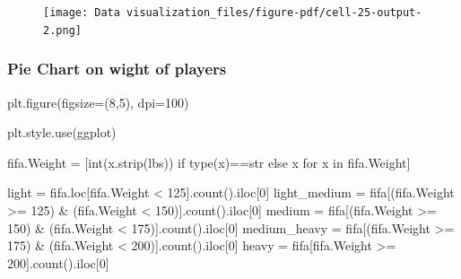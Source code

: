 \documentclass[
  letterpaper,
  DIV=11,
  numbers=noendperiod]{scrreprt}
\newenvironment{Shaded}{\begin{snugshade}}{\end{snugshade}}
\newcommand{\BuiltInTok}[1]{\textcolor[rgb]{0.00,0.23,0.31}{#1}}
\newcommand{\ControlFlowTok}[1]{\textcolor[rgb]{0.00,0.23,0.31}{#1}}
\newcommand{\DecValTok}[1]{\textcolor[rgb]{0.68,0.00,0.00}{#1}}
\newcommand{\KeywordTok}[1]{\textcolor[rgb]{0.00,0.23,0.31}{#1}}
\newcommand{\NormalTok}[1]{\textcolor[rgb]{0.00,0.23,0.31}{#1}}
\newcommand{\OperatorTok}[1]{\textcolor[rgb]{0.37,0.37,0.37}{#1}}
\newcommand{\StringTok}[1]{\textcolor[rgb]{0.13,0.47,0.30}{#1}}
\begin{document}
\begin{figure}[H]

{\centering \texttt{[image: Data visualization\_files/figure-pdf/cell-25-output-2.png]}

}

\end{figure}

\hypertarget{pie-chart-on-wight-of-players}{%
\subsubsection{Pie Chart on wight of
players}\label{pie-chart-on-wight-of-players}}

\begin{Shaded}
\begin{Highlighting}[]
\NormalTok{plt.figure(figsize}\OperatorTok{=}\NormalTok{(}\DecValTok{8}\NormalTok{,}\DecValTok{5}\NormalTok{), dpi}\OperatorTok{=}\DecValTok{100}\NormalTok{)}

\NormalTok{plt.style.use(}\StringTok{\textquotesingle{}ggplot\textquotesingle{}}\NormalTok{)}

\NormalTok{fifa.Weight }\OperatorTok{=}\NormalTok{ [}\BuiltInTok{int}\NormalTok{(x.strip(}\StringTok{\textquotesingle{}lbs\textquotesingle{}}\NormalTok{)) }\ControlFlowTok{if} \BuiltInTok{type}\NormalTok{(x)}\OperatorTok{==}\BuiltInTok{str} \ControlFlowTok{else}\NormalTok{ x }\ControlFlowTok{for}\NormalTok{ x }\KeywordTok{in}\NormalTok{ fifa.Weight]}

\NormalTok{light }\OperatorTok{=}\NormalTok{ fifa.loc[fifa.Weight }\OperatorTok{\textless{}} \DecValTok{125}\NormalTok{].count().iloc[}\DecValTok{0}\NormalTok{]}
\NormalTok{light\_medium }\OperatorTok{=}\NormalTok{ fifa[(fifa.Weight }\OperatorTok{\textgreater{}=} \DecValTok{125}\NormalTok{) }\OperatorTok{\&}\NormalTok{ (fifa.Weight }\OperatorTok{\textless{}} \DecValTok{150}\NormalTok{)].count().iloc[}\DecValTok{0}\NormalTok{]}
\NormalTok{medium }\OperatorTok{=}\NormalTok{ fifa[(fifa.Weight }\OperatorTok{\textgreater{}=} \DecValTok{150}\NormalTok{) }\OperatorTok{\&}\NormalTok{ (fifa.Weight }\OperatorTok{\textless{}} \DecValTok{175}\NormalTok{)].count().iloc[}\DecValTok{0}\NormalTok{]}
\NormalTok{medium\_heavy }\OperatorTok{=}\NormalTok{ fifa[(fifa.Weight }\OperatorTok{\textgreater{}=} \DecValTok{175}\NormalTok{) }\OperatorTok{\&}\NormalTok{ (fifa.Weight }\OperatorTok{\textless{}} \DecValTok{200}\NormalTok{)].count().iloc[}\DecValTok{0}\NormalTok{]}
\NormalTok{heavy }\OperatorTok{=}\NormalTok{ fifa[fifa.Weight }\OperatorTok{\textgreater{}=} \DecValTok{200}\NormalTok{].count().iloc[}\DecValTok{0}\NormalTok{]}


\end{Highlighting}
\end{Shaded}
\end{document}
